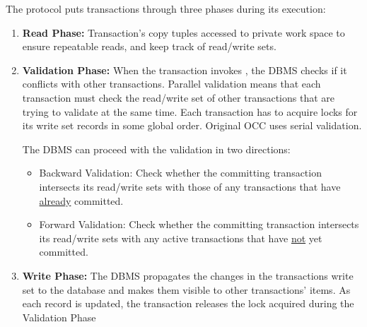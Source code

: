 \documentclass[11pt]{article}
\begin{document}
The protocol puts transactions through three phases during its execution:
\begin{enumerate}
    \item \textbf{Read Phase:}
    Transaction's copy tuples accessed to private work space to ensure repeatable reads, and keep 
    track of read/write sets.
    
    \item \textbf{Validation Phase:}
    When the transaction invokes , the DBMS checks if it conflicts with other 
    transactions. Parallel validation means that each transaction must check the read/write set of 
    other transactions that are trying to validate at the same time. Each transaction has to 
acquire 
    locks for its write set records in some global order. Original OCC uses serial validation.
    
    The DBMS can proceed with the validation in two directions:
    \begin{itemize}
        \item Backward Validation:
        Check whether the committing transaction intersects its read/write sets with those of any 
        transactions that have \underline{already} committed.
        
        \item Forward Validation:
        Check whether the committing transaction intersects its read/write sets with any active 
        transactions that have \underline{not} yet committed.
    \end{itemize}
    
    \item \textbf{Write Phase:}
    The DBMS propagates the changes in the transactions write set to the database and makes them 
    visible to other transactions' items. As each record is updated, the transaction releases the 
    lock acquired during the Validation Phase
\end{enumerate}

\end{document}
